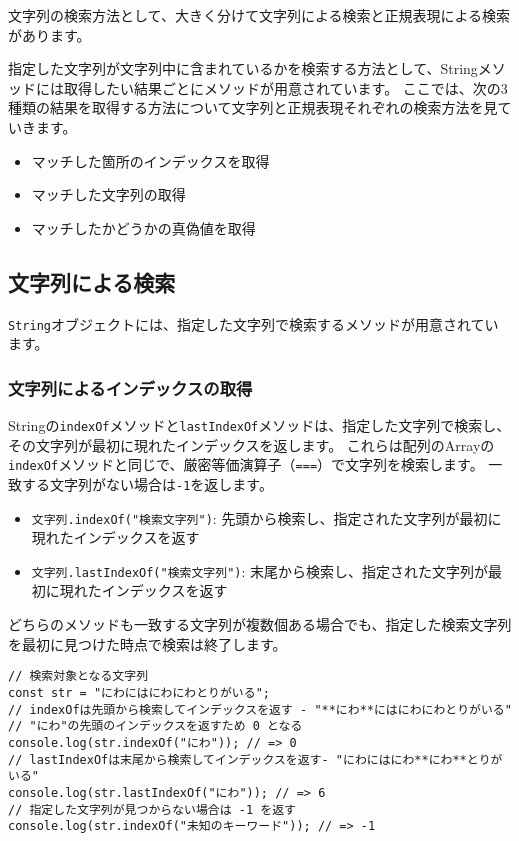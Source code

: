 文字列の検索方法として、大きく分けて文字列による検索と正規表現による検索があります。

指定した文字列が文字列中に含まれているかを検索する方法として、Stringメソッドには取得したい結果ごとにメソッドが用意されています。
ここでは、次の3種類の結果を取得する方法について文字列と正規表現それぞれの検索方法を見ていきます。

\begin{itemize}
\item
  マッチした箇所のインデックスを取得
\item
  マッチした文字列の取得
\item
  マッチしたかどうかの真偽値を取得
\end{itemize}

\hypertarget{search-by-string}{%
\subsection{文字列による検索}\label{search-by-string}}

\texttt{String}オブジェクトには、指定した文字列で検索するメソッドが用意されています。

\hypertarget{search-index-by-string}{%
\subsubsection{文字列によるインデックスの取得}\label{search-index-by-string}}

Stringの\texttt{indexOf}メソッドと\texttt{lastIndexOf}メソッドは、指定した文字列で検索し、その文字列が最初に現れたインデックスを返します。
これらは配列のArrayの\texttt{indexOf}メソッドと同じで、厳密等価演算子（\texttt{===}）で文字列を検索します。
一致する文字列がない場合は\texttt{-1}を返します。

\begin{itemize}
\item
  \texttt{文字列.indexOf("検索文字列")}:
  先頭から検索し、指定された文字列が最初に現れたインデックスを返す
\item
  \texttt{文字列.lastIndexOf("検索文字列")}:
  末尾から検索し、指定された文字列が最初に現れたインデックスを返す
\end{itemize}

どちらのメソッドも一致する文字列が複数個ある場合でも、指定した検索文字列を最初に見つけた時点で検索は終了します。

\begin{lstlisting}
// 検索対象となる文字列
const str = "にわにはにわにわとりがいる";
// indexOfは先頭から検索してインデックスを返す - "**にわ**にはにわにわとりがいる"
// "にわ"の先頭のインデックスを返すため 0 となる
console.log(str.indexOf("にわ")); // => 0
// lastIndexOfは末尾から検索してインデックスを返す- "にわにはにわ**にわ**とりがいる"
console.log(str.lastIndexOf("にわ")); // => 6
// 指定した文字列が見つからない場合は -1 を返す
console.log(str.indexOf("未知のキーワード")); // => -1
\end{lstlisting}

